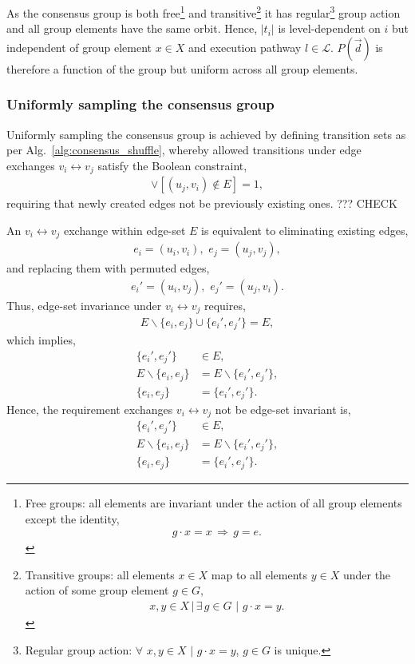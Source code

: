 \documentclass[twocolumn, aps, amsmath, amssymb, nofootinbib, superscriptaddress, longbibliography, floatfix, eqsecnum, rmp]{revtex4-2}
\begin{document}
As the consensus group is both free\footnote{Free groups: all elements are invariant under the action of all group elements except the identity,
\begin{align}
	g\cdot x = x\, \Rightarrow\, g=e.\nonumber
\end{align}} and transitive\footnote{Transitive groups: all elements $x\in X$ map to all elements $y\in X$ under the action of some group element $g\in G$,
\begin{align}
	x,y\in X \,|\, \exists\, g\in G \,\,|\,\, g\cdot x=y.\nonumber
\end{align}}
it has regular\footnote{Regular group action: $\forall\,\,x,y\in X \,\,|\,\, g\cdot x=y$, $g\in G$ is unique.} group action and all group elements have the same orbit. Hence, $|t_i|$ is level-dependent on $i$ but independent of group element $x\in X$ and execution pathway $l\in\mathcal{L}$. $P(\vec{d})$ is therefore a function of the group but uniform across all group elements.

\subsubsection{Uniformly sampling the consensus group}

Uniformly sampling the consensus group is achieved by defining transition sets as per Alg.~\ref{alg:consensus_shuffle}, whereby allowed transitions under edge exchanges \mbox{$v_i\leftrightarrow v_j$} satisfy the Boolean constraint,
\begin{align}
	[(u_i,v_j) \not\in E] \lor [(u_j,v_i)	\not\in E] = 1,
\end{align}
requiring that newly created edges not be previously existing ones. ??? CHECK

An \mbox{$v_i\leftrightarrow v_j$} exchange within edge-set $E$ is equivalent to eliminating existing edges,
\begin{align}
	e_i = (u_i,v_i),\,\, e_j = (u_j,v_j),
\end{align}
and replacing them with permuted edges,
\begin{align}
	e_i' = (u_i,v_j),\,\, e_j' = (u_j,v_i).
\end{align}
Thus, edge-set invariance under \mbox{$v_i\leftrightarrow v_j$} requires,
\begin{align}
	E \backslash \{e_i,e_j\} \cup \{e_i',e_j'\} = E,
\end{align}
which implies,
\begin{align}
	\{e_i',e_j'\} &\in E,\nonumber\\
	E \backslash \{e_i,e_j\} &= E \backslash \{e_i',e_j'\},\nonumber\\
	\{e_i,e_j\}&=\{e_i',e_j'\}.
\end{align}
Hence, the requirement exchanges \mbox{$v_i\leftrightarrow v_j$} not be edge-set invariant is,
\begin{align}
	\{e_i',e_j'\} &\in E,\nonumber\\
	E \backslash \{e_i,e_j\} &= E \backslash \{e_i',e_j'\},\nonumber\\
	\{e_i,e_j\}&=\{e_i',e_j'\}.
\end{align}
\end{document}
